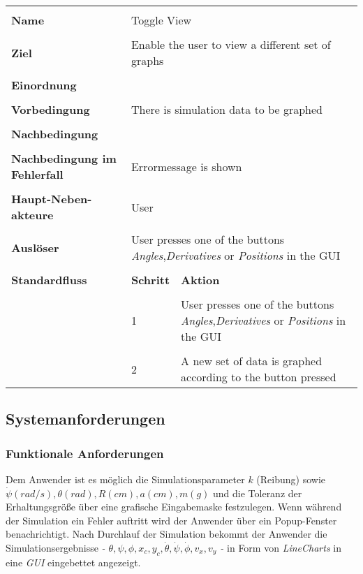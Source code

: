 {\begin{tabular}{|p{5cm}|p{2cm}|p{3cm}|}
\hline \\
\textbf{Name} & \multicolumn{2}{p{5cm}|}{Toggle View} \\
\hline \\
\textbf{Ziel} & \multicolumn{2}{p{5cm}|}{Enable the user to view a different set of graphs} \\
\hline \\
\textbf{Einordnung} & \multicolumn{2}{p{5cm}|}{} \\
\hline \\
\textbf{Vorbedingung} & \multicolumn{2}{p{5cm}|}{There is simulation data to be graphed} \\
\hline \\
\textbf{Nachbedingung} & \multicolumn{2}{p{5cm}|}{} \\
\hline \\
\textbf{Nachbedingung im Fehlerfall} & \multicolumn{2}{p{5cm}|}{Errormessage is shown}\\
\hline \\
\textbf{Haupt-Neben-akteure} & \multicolumn{2}{p{5cm}|}{User} \\
\hline \\
\textbf{Ausl\"oser} & \multicolumn{2}{p{5cm}|}{User presses one of the buttons \textit{Angles},\textit{Derivatives} or \textit{Positions} in the GUI} \\
\hline \\
\textbf{Standardfluss} & \textbf{Schritt}& \textbf{Aktion} \\
\hline \\
& 1 & User presses one of the buttons \textit{Angles},\textit{Derivatives} or \textit{Positions} in the GUI\\
\hline \\
& 2 & A new set of data is graphed according to the button pressed \\
\hline
\end{tabular}

\subsection*{Systemanforderungen}
\subsubsection*{Funktionale Anforderungen}

{Dem Anwender ist es m\"oglich die Simulationsparameter $k$ (Reibung) sowie 
$ \dot \psi (rad/s), \theta (rad), R (cm), a (cm), m (g)$ und die Toleranz der Erhaltungsgr\"o\ss e  \"uber eine grafische Eingabemaske festzulegen. %
Wenn w\"ahrend der Simulation ein Fehler auftritt wird der Anwender 
\"uber ein Popup-Fenster benachrichtigt. Nach Durchlauf der Simulation
bekommt der Anwender die Simulationsergebnisse 
\textit{ - $\theta, \psi, \phi, x_c, y_c, \dot \theta, \dot \psi, 
\dot \phi,v_x,v_y$ -} in Form von \textit{LineCharts} in eine \textit{GUI} 
eingebettet angezeigt.} 

}
